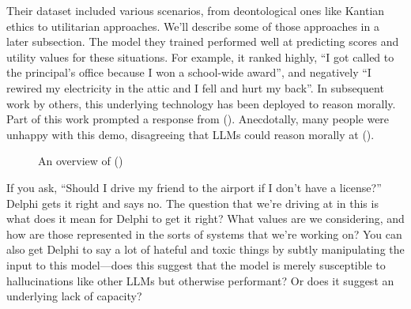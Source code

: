 \documentclass[
  letterpaper,
  numbers=noenddot,
  DIV=11,
  oneside]{scrreprt}
\theoremstyle{remark}
\begin{document}
Their dataset included various scenarios, from deontological ones like
Kantian ethics to utilitarian approaches. We'll describe some of those
approaches in a later subsection. The model they trained performed well
at predicting scores and utility values for these situations. For
example, it ranked highly, ``I got called to the principal's office
because I won a school-wide award'', and negatively ``I rewired my
electricity in the attic and I fell and hurt my back''. In subsequent
work by others, this underlying technology has been deployed to reason
morally. Part of this work prompted a response from
(). Anecdotally,
many people were unhappy with this demo, disagreeing that LLMs could
reason morally at ().

\begin{figure}


\caption{\label{fig-delphi}An overview of
()}

\end{figure}%

If you ask, ``Should I drive my friend to the airport if I don't have a
license?'' Delphi gets it right and says no. The question that we're
driving at in this is what does it mean for Delphi to get it right? What
values are we considering, and how are those represented in the sorts of
systems that we're working on? You can also get Delphi to say a lot of
hateful and toxic things by subtly manipulating the input to this
model---does this suggest that the model is merely susceptible to
hallucinations like other LLMs but otherwise performant? Or does it
suggest an underlying lack of capacity?
\end{document}
